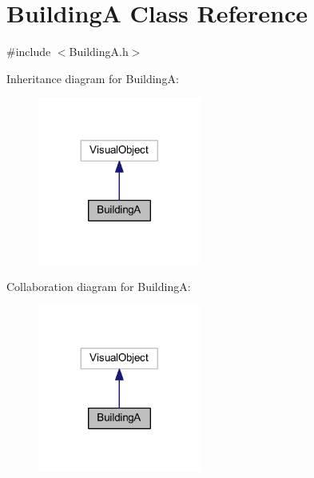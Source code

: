 \hypertarget{class_building_a}{}\section{BuildingA Class Reference}
\label{class_building_a}


{\ttfamily \#include $<$Building\+A.\+h$>$}



Inheritance diagram for BuildingA\+:
\nopagebreak
\begin{figure}[H]
\begin{center}
\leavevmode
\includegraphics[width=152pt]{class_building_a__inherit__graph}
\end{center}
\end{figure}


Collaboration diagram for BuildingA\+:
\nopagebreak
\begin{figure}[H]
\begin{center}
\leavevmode
\includegraphics[width=152pt]{class_building_a__coll__graph}
\end{center}
\end{figure}
